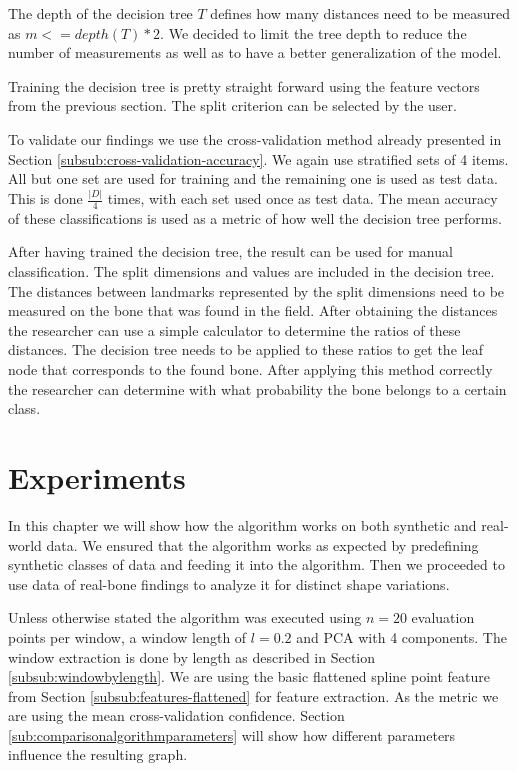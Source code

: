 \documentclass[pdftex,12pt,a4paper]{report}
\begin{document}
The depth of the decision tree $T$ defines how many distances need to be measured as $m <= depth(T) * 2$. We decided to limit the tree depth to reduce the number of measurements as well as to have a better generalization of the model.

Training the decision tree is pretty straight forward using the feature vectors from the previous section. The split criterion can be selected by the user.

To validate our findings we use the cross-validation method already presented in Section \ref{subsub:cross-validation-accuracy}. We again use stratified sets of 4 items. All but one set are used for training and the remaining one is used as test data. This is done $\frac{|D|}{4}$ times, with each set used once as test data. The mean accuracy of these classifications is used as a metric of how well the decision tree performs.

After having trained the decision tree, the result can be used for manual classification. The split dimensions and values are included in the decision tree. The distances between landmarks represented by the split dimensions need to be measured on the bone that was found in the field. After obtaining the distances the researcher can use a simple calculator to determine the ratios of these distances. The decision tree needs to be applied to these ratios to get the leaf node that corresponds to the found bone. After applying this method correctly the researcher can determine with what probability the bone belongs to a certain class.

\chapter{Experiments}

In this chapter we will show how the algorithm works on both synthetic and real-world data. We ensured that the algorithm works as expected by predefining synthetic classes of data and feeding it into the algorithm. Then we proceeded to use data of real-bone findings to analyze it for distinct shape variations. 

Unless otherwise stated the algorithm was executed using $n=20$ evaluation points per window, a window length of $l=0.2$ and PCA with 4 components. The window extraction is done by length as described in Section \ref{subsub:windowbylength}. We are using the basic flattened spline point feature from Section \ref{subsub:features-flattened} for feature extraction. As the metric we are using the mean cross-validation confidence. Section \ref{sub:comparisonalgorithmparameters} will show how different parameters influence the resulting graph.
\end{document}

